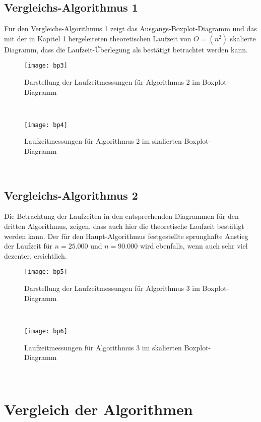\documentclass[
10pt, %
a4paper, %
oneside, %
headinclude,footinclude, %
BCOR5mm, %
]{scrartcl}
\begin{document}
\subsection{Vergleichs-Algorithmus 1}
Für den Vergleichs-Algorithmus 1 zeigt das Ausgangs-Boxplot-Diagramm und das mit der in Kapitel 1 hergeleiteten theoretischen Laufzeit von \(O=(n^2)\) skalierte Diagramm, dass die Laufzeit-Überlegung als bestätigt betrachtet werden kann.
\begin{figure}[h!]
	\centering 
	\texttt{[image: bp3]} 
	\caption[]{Darstellung der Laufzeitmessungen für Algorithmus 2 im Boxplot-Diagramm}
\end{figure}\
\begin{figure}[h!]
	\centering 
	\texttt{[image: bp4]} 
	\caption[]{Laufzeitmessungen für Algorithmus 2 im skalierten Boxplot-Diagramm}
\end{figure}\


\subsection{Vergleichs-Algorithmus 2}
Die Betrachtung der Laufzeiten in den entsprechenden Diagrammen für den dritten Algorithmus, zeigen, dass auch hier die theoretische Laufzeit bestätigt werden kann. Der für den Haupt-Algorithmus festgestellte sprunghafte Anstieg der Laufzeit für \(n=25.000\) und \(n=90.000\) wird ebenfalls, wenn auch sehr viel dezenter, ersichtlich.
\pagebreak
\begin{figure}[h!]
	\centering 
	\texttt{[image: bp5]} 
	\caption[]{Darstellung der Laufzeitmessungen für Algorithmus 3 im Boxplot-Diagramm}
\end{figure}\
\begin{figure}[h!]
	\centering 
	\texttt{[image: bp6]} 
	\caption[]{Laufzeitmessungen für Algorithmus 3 im skalierten Boxplot-Diagramm}
\end{figure}\
\pagebreak
\section{Vergleich der Algorithmen}
\end{document}
